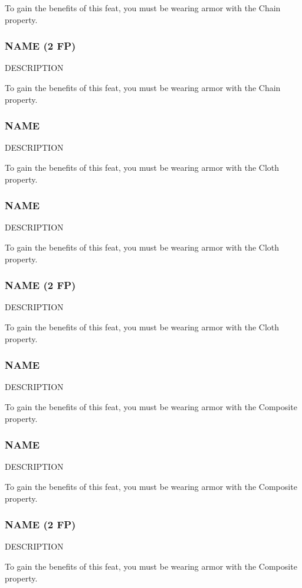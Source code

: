     To gain the benefits of this feat, you must be wearing armor with the Chain property.
\subsubsection{NAME (2 FP)} \label{feat::name}
    DESCRIPTION

    To gain the benefits of this feat, you must be wearing armor with the Chain property.
\subsubsection{NAME} \label{feat::name}
    DESCRIPTION

    To gain the benefits of this feat, you must be wearing armor with the Cloth property.
\subsubsection{NAME} \label{feat::name}
    DESCRIPTION

    To gain the benefits of this feat, you must be wearing armor with the Cloth property.
\subsubsection{NAME (2 FP)} \label{feat::name}
    DESCRIPTION

    To gain the benefits of this feat, you must be wearing armor with the Cloth property.
\subsubsection{NAME} \label{feat::name}
    DESCRIPTION

    To gain the benefits of this feat, you must be wearing armor with the Composite property.
\subsubsection{NAME} \label{feat::name}
    DESCRIPTION

    To gain the benefits of this feat, you must be wearing armor with the Composite property.
\subsubsection{NAME (2 FP)} \label{feat::name}
    DESCRIPTION

    To gain the benefits of this feat, you must be wearing armor with the Composite property.

